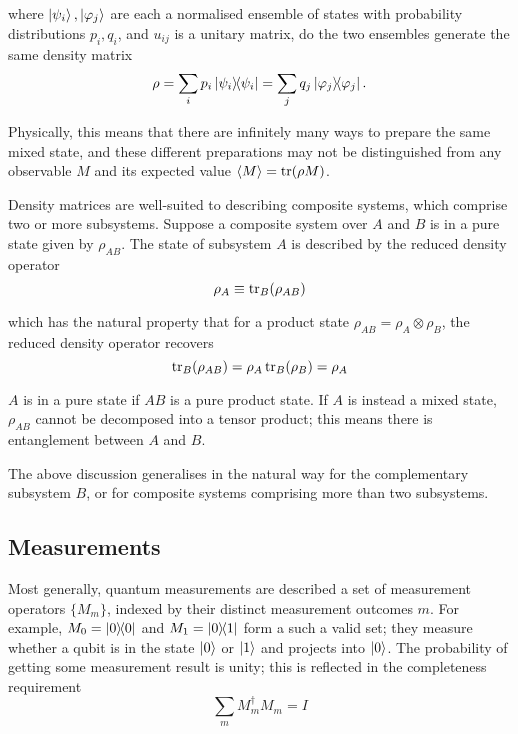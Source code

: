 \documentclass[10pt]{article}
\begin{document}
where $\ket{\psi_i}, \ket{\varphi_j}$ are each a normalised ensemble of states with probability distributions $p_i, q_i$, and $u_{ij}$ is a unitary matrix, do the two ensembles generate the same density matrix
\begin{equation}
\rho = \sum_i p_i \dyad{\psi_i} = \sum_j q_j \dyad{\varphi_j}.
\end{equation}

Physically, this means that there are infinitely many ways to prepare the same mixed state, and these different preparations may not be distinguished from any observable $M$ and its expected value $\ev{M} = \trace(\rho M)$.

Density matrices are well-suited to describing composite systems, which comprise two or more subsystems. Suppose a composite system over $A$ and $B$ is in a pure state given by $\rho_{AB}$. The state of subsystem $A$ is described by the reduced density operator
\begin{equation}
\rho_A \equiv \trace_B(\rho_{AB})
\end{equation}

which has the natural property that for a product state $\rho_{AB} = \rho_A \otimes \rho_B$, the reduced density operator recovers
\begin{equation}
\trace_B(\rho_{AB})
= \rho_A \trace_B(\rho_B) 
= \rho_A
\end{equation}

$A$ is in a pure state if $AB$ is a pure product state. If $A$ is instead a mixed state, $\rho_{AB}$ cannot be decomposed into a tensor product; this means there is entanglement between $A$ and $B$. 

The above discussion generalises in the natural way for the complementary subsystem $B$, or for composite systems comprising more than two subsystems.





\subsection{Measurements}

Most generally, quantum measurements are described a set of measurement operators $\{M_m\}$, indexed by their distinct measurement outcomes $m$. For example, $M_0 = \op{0}{0}$ and $M_1= \op{0}{1}$ form a such a valid set; they measure whether a qubit is in the state $\ket{0}$ or $\ket{1}$ and projects into $\ket{0}$. The probability of getting some measurement result is unity; this is reflected in the completeness requirement
\begin{equation}
\sum_m M_m^\dagger M_m = I
\end{equation}
\end{document}
